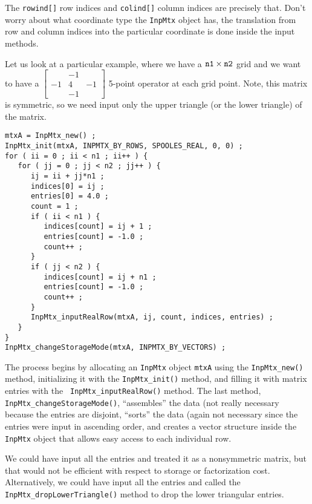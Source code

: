 The {\tt rowind[]} row indices and {\tt colind[]} column indices 
are precisely that. 
Don't worry about what coordinate type the {\tt InpMtx} object has,
the translation from row and column indices into the particular
coordinate is done inside the input methods.
\par
Let us look at a particular example, where we have a 
${\tt n1} \times {\tt n2}$ grid and we want to have a
$\left \lbrack \begin{array}{ccc}
   & -1 &    \\
-1 &  4 & -1 \\
   & -1 & 
\end{array} \right \rbrack$ 
5-point operator at each grid point.
Note, this matrix is symmetric, so we need input only the upper
triangle (or the lower triangle) of the matrix.
\begin{verbatim}
mtxA = InpMtx_new() ;
InpMtx_init(mtxA, INPMTX_BY_ROWS, SPOOLES_REAL, 0, 0) ;
for ( ii = 0 ; ii < n1 ; ii++ ) {
   for ( jj = 0 ; jj < n2 ; jj++ ) {
      ij = ii + jj*n1 ;
      indices[0] = ij ;
      entries[0] = 4.0 ;
      count = 1 ;
      if ( ii < n1 ) {
         indices[count] = ij + 1 ;
         entries[count] = -1.0 ;
         count++ ;
      }
      if ( jj < n2 ) {
         indices[count] = ij + n1 ;
         entries[count] = -1.0 ;
         count++ ;
      }
      InpMtx_inputRealRow(mtxA, ij, count, indices, entries) ;
   }
}
InpMtx_changeStorageMode(mtxA, INPMTX_BY_VECTORS) ;
\end{verbatim}
The process begins by allocating an {\tt InpMtx} object {\tt mtxA}
using the {\tt InpMtx\_new()} method,
initializing it with the {\tt InpMtx\_init()} method, 
and filling it with matrix entries with the {\tt
InpMtx\_inputRealRow()} method.
The last method, {\tt InpMtx\_changeStorageMode()},
``assembles'' the data (not really necessary because the entries
are disjoint, 
``sorts'' the data (again not necessary since the entries were
input in ascending order,
and creates a vector structure inside the {\tt InpMtx} object that
allows easy access to each individual row.
\par
We could have input all the entries and treated it as a
nonsymmetric matrix, but that would not be efficient with respect
to storage or factorization cost.
Alternatively, we could have input all the entries and called the 
{\tt InpMtx\_dropLowerTriangle()} method to drop the lower
triangular entries.
\par
